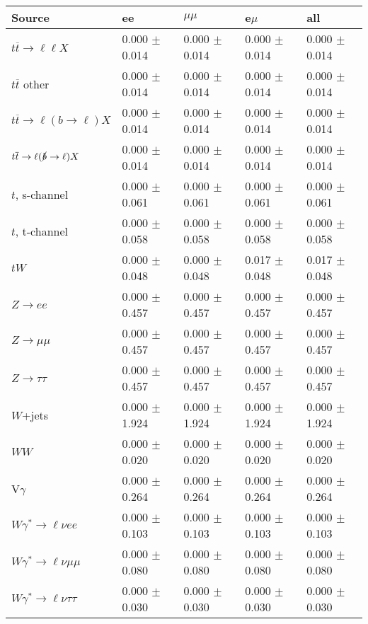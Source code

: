 \begin{tabular}{l | l l l l}
\hline\hline
 Source  &  ee  &  $\mu\mu$  &  e$\mu$  &  all \\
\hline
$t\overline{t}\rightarrow \ell\ell X$ &  0.000 $\pm$  0.014 &  0.000 $\pm$  0.014 &  0.000 $\pm$  0.014 &  0.000 $\pm$  0.014\\
$t\overline{t}$ other &  0.000 $\pm$  0.014 &  0.000 $\pm$  0.014 &  0.000 $\pm$  0.014 &  0.000 $\pm$  0.014\\
$t\overline{t}\rightarrow \ell(b\rightarrow \ell)X$ &  0.000 $\pm$  0.014 &  0.000 $\pm$  0.014 &  0.000 $\pm$  0.014 &  0.000 $\pm$  0.014\\
$t\overline{t}\rightarrow \ell(\slashed{b}\rightarrow \ell)X$ &  0.000 $\pm$  0.014 &  0.000 $\pm$  0.014 &  0.000 $\pm$  0.014 &  0.000 $\pm$  0.014\\
\hline
$t$, s-channel &  0.000 $\pm$  0.061 &  0.000 $\pm$  0.061 &  0.000 $\pm$  0.061 &  0.000 $\pm$  0.061\\
$t$, t-channel &  0.000 $\pm$  0.058 &  0.000 $\pm$  0.058 &  0.000 $\pm$  0.058 &  0.000 $\pm$  0.058\\
$tW$ &  0.000 $\pm$  0.048 &  0.000 $\pm$  0.048 &  0.017 $\pm$  0.048 &  0.017 $\pm$  0.048\\
\hline
$Z\rightarrow ee$ &  0.000 $\pm$  0.457 &  0.000 $\pm$  0.457 &  0.000 $\pm$  0.457 &  0.000 $\pm$  0.457\\
$Z\rightarrow\mu\mu$ &  0.000 $\pm$  0.457 &  0.000 $\pm$  0.457 &  0.000 $\pm$  0.457 &  0.000 $\pm$  0.457\\
$Z\rightarrow\tau\tau$ &  0.000 $\pm$  0.457 &  0.000 $\pm$  0.457 &  0.000 $\pm$  0.457 &  0.000 $\pm$  0.457\\
$W$+jets &  0.000 $\pm$  1.924 &  0.000 $\pm$  1.924 &  0.000 $\pm$  1.924 &  0.000 $\pm$  1.924\\
$WW$ &  0.000 $\pm$  0.020 &  0.000 $\pm$  0.020 &  0.000 $\pm$  0.020 &  0.000 $\pm$  0.020\\
\hline
V$\gamma$ &  0.000 $\pm$  0.264 &  0.000 $\pm$  0.264 &  0.000 $\pm$  0.264 &  0.000 $\pm$  0.264\\
$W\gamma^{*}\rightarrow\ell\nu e e$ &  0.000 $\pm$  0.103 &  0.000 $\pm$  0.103 &  0.000 $\pm$  0.103 &  0.000 $\pm$  0.103\\
$W\gamma^{*}\rightarrow\ell\nu\mu\mu$ &  0.000 $\pm$  0.080 &  0.000 $\pm$  0.080 &  0.000 $\pm$  0.080 &  0.000 $\pm$  0.080\\
$W\gamma^{*}\rightarrow\ell\nu\tau\tau$ &  0.000 $\pm$  0.030 &  0.000 $\pm$  0.030 &  0.000 $\pm$  0.030 &  0.000 $\pm$  0.030\\

\end{tabular}
